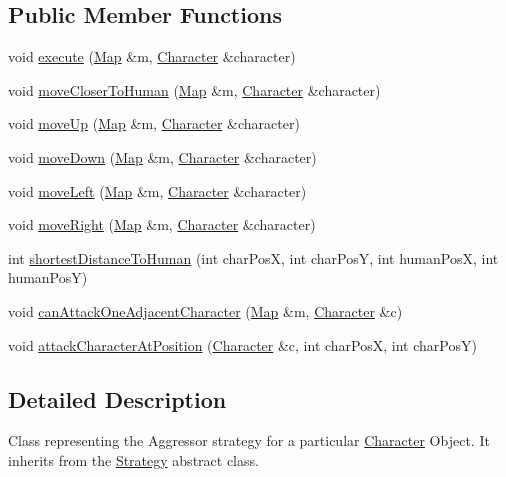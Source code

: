 \subsection*{Public Member Functions}
\begin{DoxyCompactItemize}
\item 
void \hyperlink{classAggressorStrategy_a64de03f063f8b195da7134965148f1c8}{execute} (\hyperlink{classMap}{Map} \&m, \hyperlink{classCharacter}{Character} \&character)
\item 
void \hyperlink{classAggressorStrategy_a375f0346535b7a684f5222780d1cfde9}{move\+Closer\+To\+Human} (\hyperlink{classMap}{Map} \&m, \hyperlink{classCharacter}{Character} \&character)
\item 
void \hyperlink{classAggressorStrategy_a75cdb4e9da29d676e7ae8ae521be9305}{move\+Up} (\hyperlink{classMap}{Map} \&m, \hyperlink{classCharacter}{Character} \&character)
\item 
void \hyperlink{classAggressorStrategy_a9a7ca424c311204957f647d92c39cbb9}{move\+Down} (\hyperlink{classMap}{Map} \&m, \hyperlink{classCharacter}{Character} \&character)
\item 
void \hyperlink{classAggressorStrategy_a19633eb812b64a4231ab8d4132ee0df7}{move\+Left} (\hyperlink{classMap}{Map} \&m, \hyperlink{classCharacter}{Character} \&character)
\item 
void \hyperlink{classAggressorStrategy_ab1c1e6cba68e2b2c568548916cf0fe33}{move\+Right} (\hyperlink{classMap}{Map} \&m, \hyperlink{classCharacter}{Character} \&character)
\item 
int \hyperlink{classAggressorStrategy_aff8804c562838466c0bc7dd5a7abcbb5}{shortest\+Distance\+To\+Human} (int char\+PosX, int char\+PosY, int human\+PosX, int human\+PosY)
\item 
void \hyperlink{classAggressorStrategy_ab086a8a043aa9e00b43f52e2ec8c428b}{can\+Attack\+One\+Adjacent\+Character} (\hyperlink{classMap}{Map} \&m, \hyperlink{classCharacter}{Character} \&c)
\item 
void \hyperlink{classAggressorStrategy_a9b27ee4123b38c807ad247ebe2a1a65f}{attack\+Character\+At\+Position} (\hyperlink{classCharacter}{Character} \&c, int char\+PosX, int char\+PosY)
\end{DoxyCompactItemize}


\subsection{Detailed Description}
Class representing the Aggressor strategy for a particular \hyperlink{classCharacter}{Character} Object. It inherits from the \hyperlink{classStrategy}{Strategy} abstract class. 

